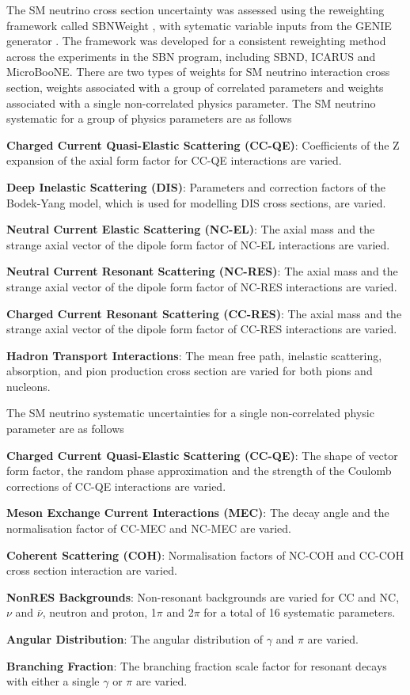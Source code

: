 The SM neutrino cross section uncertainty was assessed using the reweighting framework called SBNWeight \cite{}, with sytematic variable inputs from the GENIE generator \cite{}.
The framework was developed for a consistent reweighting method across the experiments in the SBN program, including SBND, ICARUS and MicroBooNE.
There are two types of weights for SM neutrino interaction cross section, weights associated with a group of correlated parameters and weights associated with a single non-correlated physics parameter.
The SM neutrino systematic for a group of physics parameters are as follows
\begin{coloritemize}
\item\textbf{Charged Current Quasi-Elastic Scattering (CC-QE)}: Coefficients of the Z expansion of the axial form factor for CC-QE interactions are varied.
\item\textbf{Deep Inelastic Scattering (DIS)}: Parameters and correction factors of the Bodek-Yang model, which is used for modelling DIS cross sections, are varied. 
\item\textbf{Neutral Current Elastic Scattering (NC-EL)}: The axial mass and the strange axial vector of the dipole form factor of NC-EL interactions are varied.
\item\textbf{Neutral Current Resonant Scattering (NC-RES)}: The axial mass and the strange axial vector of the dipole form factor of NC-RES interactions are varied.
\item\textbf{Charged Current Resonant Scattering (CC-RES)}: The axial mass and the strange axial vector of the dipole form factor of CC-RES interactions are varied.
\item\textbf{Hadron Transport Interactions}: The mean free path, inelastic scattering, absorption, and pion production cross section are varied for both pions and nucleons.
\end{coloritemize}
The SM neutrino systematic uncertainties for a single non-correlated physic parameter are as follows
\begin{coloritemize}
\item\textbf{Charged Current Quasi-Elastic Scattering (CC-QE)}: The shape of vector form factor, the random phase approximation and the strength of the Coulomb corrections of CC-QE interactions are varied.
\item\textbf{Meson Exchange Current Interactions (MEC)}: The decay angle and the normalisation factor of CC-MEC and NC-MEC are varied.
\item\textbf{Coherent Scattering (COH)}: Normalisation factors of NC-COH and CC-COH cross section interaction are varied.
\item\textbf{NonRES Backgrounds}: Non-resonant backgrounds are varied for CC and NC, $\nu$ and $\bar{\nu}$, neutron and proton, 1$\pi$ and 2$\pi$ for a total of 16 systematic parameters.
\item\textbf{Angular Distribution}: The angular distribution of $\gamma$ and $\pi$ are varied.
\item\textbf{Branching Fraction}: The branching fraction scale factor for resonant  decays with either a single $\gamma$ or $\pi$ are varied.
\end{coloritemize}
